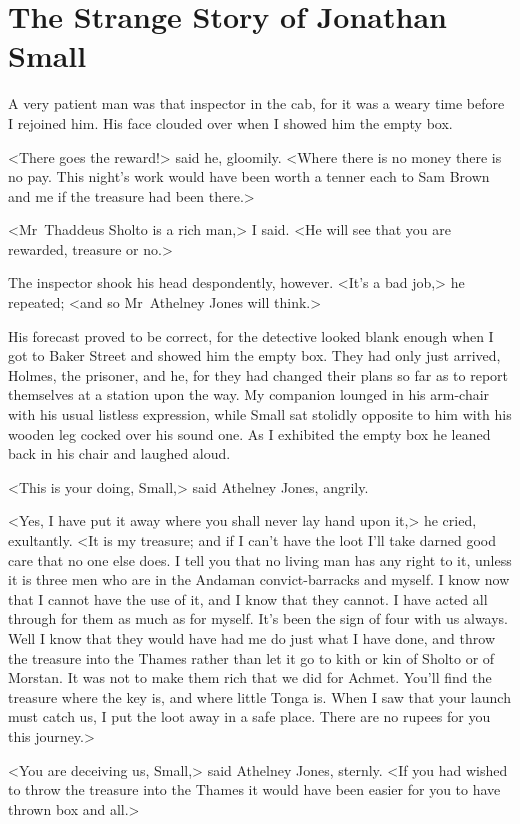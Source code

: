 \chapter{The Strange Story of Jonathan Small}
\lettrine{A}{} very patient man was that inspector in the cab, for it was a weary time before I rejoined him. His face clouded over when I showed him the empty box.

\zz
<There goes the reward!> said he, gloomily. <Where there is no money there is no pay. This night's work would have been worth a tenner each to Sam Brown and me if the treasure had been there.>

<Mr~Thaddeus Sholto is a rich man,> I said. <He will see that you are rewarded, treasure or no.>

The inspector shook his head despondently, however. <It's a bad job,> he repeated; <and so Mr~Athelney Jones will think.>

His forecast proved to be correct, for the detective looked blank enough when I got to Baker Street and showed him the empty box. They had only just arrived, Holmes, the prisoner, and he, for they had changed their plans so far as to report themselves at a station upon the way. My companion lounged in his arm-chair with his usual listless expression, while Small sat stolidly opposite to him with his wooden leg cocked over his sound one. As I exhibited the empty box he leaned back in his chair and laughed aloud.

<This is your doing, Small,> said Athelney Jones, angrily.

<Yes, I have put it away where you shall never lay hand upon it,> he cried, exultantly. <It is my treasure; and if I can't have the loot I'll take darned good care that no one else does. I tell you that no living man has any right to it, unless it is three men who are in the Andaman convict-barracks and myself. I know now that I cannot have the use of it, and I know that they cannot. I have acted all through for them as much as for myself. It's been the sign of four with us always. Well I know that they would have had me do just what I have done, and throw the treasure into the Thames rather than let it go to kith or kin of Sholto or of Morstan. It was not to make them rich that we did for Achmet. You'll find the treasure where the key is, and where little Tonga is. When I saw that your launch must catch us, I put the loot away in a safe place. There are no rupees for you this journey.>

<You are deceiving us, Small,> said Athelney Jones, sternly. <If you had wished to throw the treasure into the Thames it would have been easier for you to have thrown box and all.>

